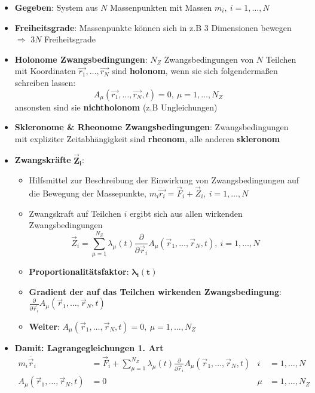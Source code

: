 \begin{itemize}
	\item \textbf{Gegeben}: System aus $N$ Massenpunkten mit Massen $m_i,\ i = 1, \dots, N$
	\item \textbf{Freiheitsgrade}: Massenpunkte können sich in z.B $3$ Dimensionen bewegen $\Rightarrow$ $3N$ Freiheitsgrade
	\item \textbf{Holonome Zwangsbedingungen}: $N_Z$ Zwangsbedingungen von $N$ Teilchen mit Koordinaten $\vec{r_1}, \dots, \vec{r_N}$ sind \textbf{holonom}, wenn sie sich folgendermaßen schreiben lassen: $$A_\mu(\vec{r_1}, \dots, \vec{r_N}, t) = 0,\ \mu = 1, \dots, N_Z$$ ansonsten sind sie \textbf{nichtholonom} (z.B Ungleichungen)
	\item \textbf{Skleronome \& Rheonome Zwangsbedingungen}: Zwangsbedingungen mit expliziter Zeitabhängigkeit sind \textbf{rheonom}, alle anderen \textbf{skleronom}
	\item \textbf{Zwangskräfte} $\mathbf{\vec{Z}_i}$:
	\begin{itemize}
		\item Hilfsmittel zur Beschreibung der Einwirkung von Zwangsbedingungen auf die Bewegung der Massepunkte, $m_i\ddot{\vec{r_i}} = \vec{F}_i + \vec{Z}_i,\ i= 1, \dots, N$
		\item Zwangskraft auf Teilchen $i$ ergibt sich aus allen wirkenden Zwangsbedingungen
		$$
			\vec{Z}_i = \sum^{N_Z}_{\mu=1}\lambda_\mu(t)\frac{\partial}{\partial\vec{r}_i}A_\mu(\vec{r}_1, \dots, \vec{r}_N, t),\ i = 1,\dots,N
		$$
		\item \textbf{Proportionalitätsfaktor}: $\mathbf{\lambda_i(t)}$
		\item \textbf{Gradient der auf das Teilchen wirkenden Zwangsbedingung}: $\frac{\partial}{\partial\vec{r}_i}A_\mu(\vec{r}_1, \dots, \vec{r}_N, t)$
		\item \textbf{Weiter}: $A_\mu(\vec{r}_1, \dots, \vec{r}_N, t) = 0,\ \mu = 1, \dots, N_Z$
	\end{itemize}
	\item \textbf{Damit: Lagrangegleichungen 1. Art}
	\begin{align*}
		m_i\ddot{\vec{r}_i} &= \vec{F}_i + \sum^{N_Z}_{\mu=1}\lambda_\mu(t)\frac{\partial}{\partial\vec{r}_i}A_\mu(\vec{r}_1, \dots, \vec{r}_N, t) &i &= 1,\dots,N\\
		A_\mu(\vec{r}_1, \dots, \vec{r}_N, t) &= 0 &\mu &= 1, \dots, N_Z
	\end{align*}
\end{itemize}

\newpage
